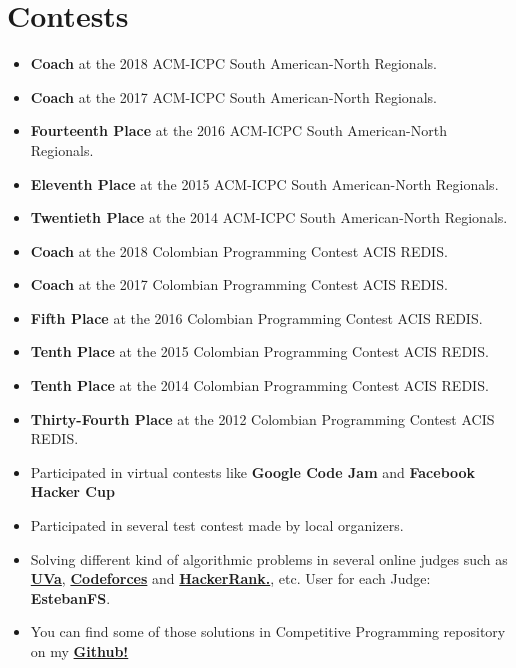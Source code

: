 \documentclass[a4paper,11pt]{article} %
\begin{document}
\newpage
\section{Contests}
\begin{itemize}
\item \textbf{Coach} at the 2018 ACM-ICPC South American-North Regionals.
\item \textbf{Coach} at the 2017 ACM-ICPC South American-North Regionals.
\item \textbf{Fourteenth Place} at the 2016 ACM-ICPC South American-North Regionals.
\item \textbf{Eleventh Place} at the 2015 ACM-ICPC South American-North Regionals.
\item \textbf{Twentieth Place} at the 2014 ACM-ICPC South American-North Regionals.
\item \textbf{Coach} at the 2018 Colombian Programming Contest ACIS REDIS.
\item \textbf{Coach} at the 2017 Colombian Programming Contest ACIS REDIS.
\item \textbf{Fifth Place} at the 2016 Colombian Programming Contest ACIS REDIS.
\item \textbf{Tenth Place} at the 2015 Colombian Programming Contest ACIS REDIS.
\item \textbf{Tenth Place} at the 2014 Colombian Programming Contest ACIS REDIS.
\item \textbf{Thirty-Fourth Place} at the 2012 Colombian Programming Contest ACIS REDIS.
\item Participated in virtual contests like \textbf{Google Code Jam} and \textbf{Facebook Hacker Cup}
\item Participated in several test contest made by local organizers.
\item Solving different kind of algorithmic problems in several online judges such as
\href{http://uhunt.felix-halim.net/id/152728}{\textbf{UVa}}, \href{http://codeforces.com/profile/EstebanFS}{\textbf{Codeforces}} and \href{https://www.hackerrank.com/EstebanFS}{\textbf{HackerRank.}}, etc.
User for each Judge: \textbf{EstebanFS}.
\item You can find some of those solutions in Competitive Programming repository on my \href{https://github.com/EstebanFS/Competitive-Programming}{\textbf{Github!}}
\end{itemize}
\end{document}
